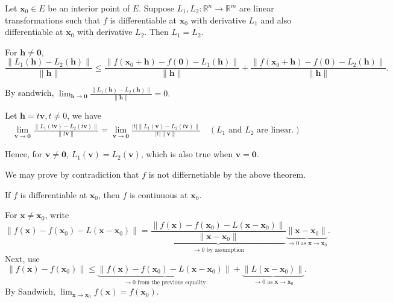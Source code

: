 \begin{theorem}
Let $\mathbf{x}_0 \in E$ be an interior point of $E$. 
Suppose $L_1, L_2: \mathbb{R}^n \to \mathbb{R}^m$ are linear transformations such that $f$ is differentiable at $\mathbf{x}_0$ with derivative $L_1$ and also differentiable at $\mathbf{x}_0$ with derivative $L_2$. 
Then $L_1 = L_2$.
\end{theorem}


\begin{pfbox}

For $\mathbf{h}\ne \mathbf{0}$,
\[\frac{\| L_1(\mathbf{h}) - L_2(\mathbf{h}) \|}{\|\mathbf{h}\|}\le
\frac{\| f(\mathbf{x}_0+\mathbf{h})-f(\mathbf{0})-L_1(\mathbf{h}) \|}{\|\mathbf{h}\|} +
\frac{\| f(\mathbf{x}_0+\mathbf{h})-f(\mathbf{0})-L_2(\mathbf{h}) \|}{\|\mathbf{h}\|}.
\]

By sandwich, $\lim_{\mathbf{h}\to\mathbf{0}}\frac{\| L_1(\mathbf{h}) - L_2(\mathbf{h}) \|}{\|\mathbf{h}\|}=0.$

Let $\mathbf{h}=t\mathbf{v}, t\ne 0$, we have
\begin{align*}
\lim_{\mathbf{\mathbf{v}}\to\mathbf{0}}\frac{\| L_1(t\mathbf{v}) - L_2(t\mathbf{v}) \|}{\| t\mathbf{v}\|} = 
\lim_{\mathbf{\mathbf{v}}\to\mathbf{0}}\frac{|t| \|L_1(\mathbf{v}) - L_2(t\mathbf{v})\|}{|t| \|\mathbf{v}\|} \quad (\text{$L_1$ and $L_2$ are linear.})
\end{align*}

Hence, for $\mathbf{v}\ne\mathbf{0}$, $L_1(\mathbf{v})=L_2(\mathbf{v})$, which is also true when $\mathbf{v}=\mathbf{0}.$

\end{pfbox}

We may prove by contradiction that $f$ is not differnetiable by the above theorem.

\begin{theorem}
If $f$ is differentiable at $\mathbf{x}_0$, then $f$ is continuous at $\mathbf{x}_0$.
\end{theorem}

\begin{pfbox}

For $\mathbf{x}\neq \mathbf{x}_0$, write
\[\|f(\mathbf{x}) - f(\mathbf{x}_0)-L(\mathbf{x} - \mathbf{x}_0)\| = \underbrace{\frac{\|f(\mathbf{x}) - f(\mathbf{x}_0) - L(\mathbf{x} - \mathbf{x}_0)\|}{\|\mathbf{x} - \mathbf{x}_0\|}}_{\to 0 \text{ by assumption}} \underbrace{\|\mathbf{x} - \mathbf{x}_0\|}_{\to 0 \text{ as } \mathbf{x}\to\mathbf{x}_0}.\]
Next, use
\[\|f(\mathbf{x}) - f(\mathbf{x}_0)\|\le \underbrace{\|f(\mathbf{x}) - f(\mathbf{x}_0)-L(\mathbf{x} - \mathbf{x}_0)\|}_{\to 0 \text{ from the previous equality}} + \underbrace{\|L(\mathbf{x} - \mathbf{x}_0)\|}_{\to 0 \text{ as } \mathbf{x}\to\mathbf{x}_0}.\]
By Sandwich, $\lim_{\mathbf{x}\to\mathbf{x}_0}f(\mathbf{x})=f(\mathbf{x}_0).$

\end{pfbox}


